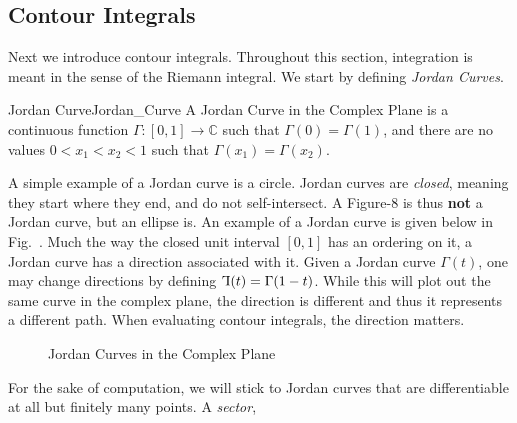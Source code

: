 \subsection{Contour Integrals}
    Next we introduce contour integrals. Throughout this section,
    integration is meant in the sense of the Riemann integral.
    We start by defining \textit{Jordan Curves}.
    \begin{ldefinition}{Jordan Curve}{Jordan_Curve}
        A Jordan Curve in the Complex Plane is a continuous function
        $\Gamma:[0,1]\rightarrow\mathbb{C}$ such that
        $\Gamma(0)=\Gamma(1)$, and there are no values $0<x_{1}<x_{2}<1$
        such that $\Gamma(x_{1})=\Gamma(x_{2})$.
    \end{ldefinition}
    A simple example of a Jordan curve is a circle. Jordan curves are
    \textit{closed}, meaning they start where they end, and do not
    self-intersect. A Figure-8 is thus \textbf{not} a Jordan curve, but
    an ellipse is. An example of a Jordan curve is given below in
    Fig.~. Much the way
    the closed unit interval $[0,1]$ has an ordering on it, a Jordan
    curve has a direction associated with it. Given a Jordan curve
    $\Gamma(t)$, one may change directions by defining
    $\reflectbox{\ensuremath{\Gamma}}(t)=\Gamma(1-t)$.
    While this will plot out the same curve in the complex plane, the
    direction is different and thus it represents a different path. When
    evaluating contour integrals, the direction matters.
    \begin{figure}[H]
        \captionsetup{type=figure}
        \centering
        \begin{subfigure}[b]{0.49\textwidth}
            \centering
            
            \label{fig:Ex_of_Smooth_Jordan_Curve}
        \end{subfigure}
        \begin{subfigure}[b]{0.49\textwidth}
            \centering
            
            \label{fig:Ex_of_Jordan_Curve_Sector}
        \end{subfigure}
        \caption{Jordan Curves in the Complex Plane}
        \label{fig:Ex_of_Jordan_Curve}
    \end{figure}
    For the sake of computation, we will stick to Jordan curves that are
    differentiable at all but finitely many points. A \textit{sector},
